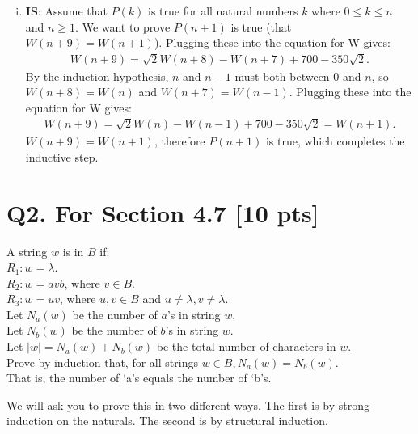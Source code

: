 \documentclass[12pt]{article}
\begin{document}
\begin{enumerate}[(a)]
\begin{enumerate}[(i)]
				\item \textbf{IS}: Assume that $P(k)$ is true for all natural numbers $k$
					where $0\leq k\leq n$ and $n\geq 1$. We want to prove $P(n+1)$ is true
					(that $W(n+9)=W(n+1)$). Plugging these into the equation for W gives:
					\begin{align*}
						W(n+9) = \sqrt{2}W(n+8)-W(n+7)+700-350\sqrt{2}.
					\end{align*}
					By the induction hypothesis, $n$ and $n-1$ must both between $0$ and $n$,
					so $W(n+8)=W(n)$ and $W(n+7)=W(n-1)$. Plugging these into the equation
					for W gives:
					\begin{align*}
						W(n+9) = \sqrt{2}W(n)-W(n-1)+700-350\sqrt{2}= W(n+1).
					\end{align*}
					$W(n+9)=W(n+1)$, therefore $P(n+1)$ is true, which completes the
					inductive step.
			\end{enumerate}
	\end{enumerate}

	\newpage

	\newpage

	\section*{\textbf{Q2. For Section 4.7} [10 pts]}

	\noindent
	A string $w$ is in $B$ if: \\
	\noindent
	$R_{1}: w = \lambda.$\\
	$R_{2}: w = avb$, where $v \in B.$\\
	$R_{3}: w = uv$, where $u, v \in B$ and $u \neq \lambda, v \neq \lambda.$ \\

	\noindent
	Let $N_{a}(w)$ be the number of $a$'s in string $w$.\\
	Let $N_{b}(w)$ be the number of $b$'s in string $w$.\\
	Let $|w| = N_{a}(w) + N_{b}(w)$ be the total number of characters in $w$.\\

	\noindent
	Prove by induction that, for all strings $w \in B, N_{a}(w) = N_{b}(w).$\\
	That is, the number of `a's equals the number of `b's.

	\medskip

	We will ask you to prove this in two different ways. The first is by strong induction
	on the naturals. The second is by structural induction. \\
\end{document}
